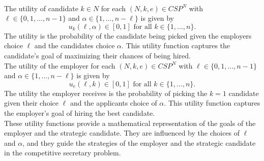 \documentclass{article}
\begin{document}
\\[2ex]
The utility of candidate $k \in N$ for each $(N,k,e) \in CSP^N $ with $\ell\in\{0,1,\ldots, n-1\}$ and $\alpha \in \{1,\ldots,n-\ell \} $ is given by 
$$ u_{k}(\ell, \alpha) \in [0,1] \text{ for all } k \in \{1, \ldots, n \}.  $$
The utility is the probability of the candidate being picked given the employers choice $\ell$ and the candidates choice $\alpha$. This utility function captures the candidate's goal of maximizing their chances of being hired.
\\[2ex]
The utility of the employer for each $(N,k,e) \in CSP^N $ with $\ell\in\{0,1,\ldots, n-1\}$ and $\alpha \in \{1,\ldots,n-\ell \} $ is given by 
$$u_e(\ell, k) \in [0,1] \text{ for all } k \in \{1, \ldots, n \}.  $$ 
The utility the employer receives is the probability of picking the $k=1$ candidate given their choice $\ell$ and the applicants choice of $\alpha$. This utility function captures the employer's goal of hiring the best candidate.
\\[2ex]
These utility functions provide a mathematical representation of the goals of the employer and the strategic candidate. They are influenced by the choices of $\ell$ and $\alpha$, and they guide the strategies of the employer and the strategic candidate in the competitive secretary problem.
\\[2ex]
\end{document}
